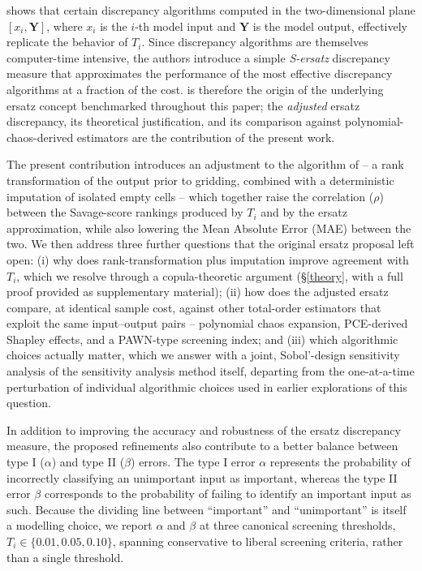 \documentclass[12pt]{article}
\begin{document}
\citet{puy2024discrepancy} shows that certain discrepancy algorithms computed in the two-dimensional plane $[x_i,\bm{Y}]$, where $x_i$ is the $i$-th model input and $\bm{Y}$ is the model output, effectively replicate the behavior of $T_i$. Since discrepancy algorithms are themselves computer-time intensive, the authors introduce a simple \textit{S-ersatz} discrepancy measure that approximates the performance of the most effective discrepancy algorithms at a fraction of the cost. \citet{puy2024discrepancy} is therefore the origin of the underlying ersatz concept benchmarked throughout this paper; the \textit{adjusted} ersatz discrepancy, its theoretical justification, and its comparison against polynomial-chaos-derived estimators are the contribution of the present work.

The present contribution introduces an adjustment to the algorithm of \citet{puy2024discrepancy} -- a rank transformation of the output prior to gridding, combined with a deterministic imputation of isolated empty cells -- which together raise the correlation ($\rho$) between the Savage-score rankings produced by $T_i$ and by the ersatz approximation, while also lowering the Mean Absolute Error (MAE) between the two. We then address three further questions that the original ersatz proposal left open: (i) why does rank-transformation plus imputation improve agreement with $T_i$, which we resolve through a copula-theoretic argument (\S\ref{theory}, with a full proof provided as supplementary material); (ii) how does the adjusted ersatz compare, at identical sample cost, against other total-order estimators that exploit the same input--output pairs -- polynomial chaos expansion, PCE-derived Shapley effects, and a PAWN-type screening index; and (iii) which algorithmic choices actually matter, which we answer with a joint, Sobol'-design sensitivity analysis of the sensitivity analysis method itself, departing from the one-at-a-time perturbation of individual algorithmic choices used in earlier explorations of this question.

In addition to improving the accuracy and robustness of the ersatz discrepancy measure, the proposed refinements also contribute to a better balance between type I ($\alpha$) and type II ($\beta$) errors. The type I error $\alpha$ represents the probability of incorrectly classifying an unimportant input as important, whereas the type II error $\beta$ corresponds to the probability of failing to identify an important input as such. Because the dividing line between ``important'' and ``unimportant'' is itself a modelling choice, we report $\alpha$ and $\beta$ at three canonical screening thresholds, $T_i \in \{0.01, 0.05, 0.10\}$, spanning conservative to liberal screening criteria, rather than a single threshold.
\end{document}
